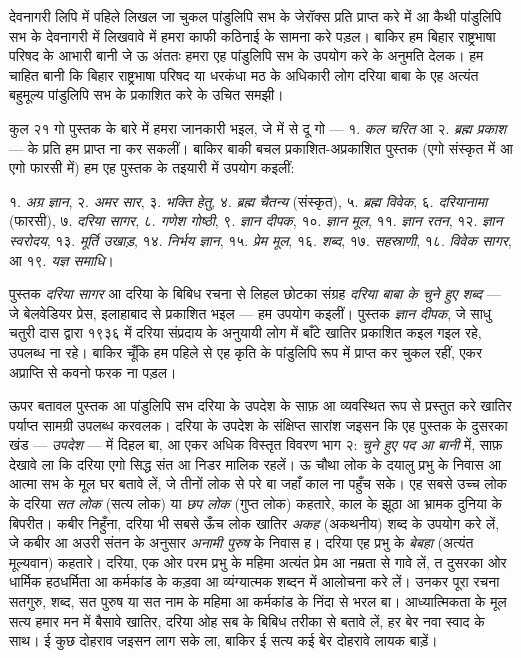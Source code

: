 देवनागरी लिपि में पहिले लिखल जा चुकल पांडुलिपि सभ के जेरॉक्स प्रति प्राप्त करे में आ कैथी पांडुलिपि सभ के देवनागरी में लिखवावे में हमरा काफी कठिनाई के सामना करे पड़ल। बाकिर हम बिहार राष्ट्रभाषा परिषद के आभारी बानी जे ऊ अंततः हमरा एह पांडुलिपि सभ के उपयोग करे के अनुमति देलक। हम चाहित बानी कि बिहार राष्ट्रभाषा परिषद या धरकंधा मठ के अधिकारी लोग दरिया बाबा के एह अत्यंत बहुमूल्य पांडुलिपि सभ के प्रकाशित करे के उचित समझी।

कुल २१ गो पुस्तक के बारे में हमरा जानकारी भइल, जे में से दू गो — १. \textit{कल चरित} आ २. \textit{ब्रह्म प्रकाश} — के प्रति हम प्राप्त ना कर सकलीं। बाकिर बाकी बचल प्रकाशित-अप्रकाशित पुस्तक (एगो संस्कृत में आ एगो फारसी में) हम एह पुस्तक के तइयारी में उपयोग कइलीं:

१. \textit{अग्र ज्ञान}, २. \textit{अमर सार}, ३. \textit{भक्ति हेतु}, ४. \textit{ब्रह्म चैतन्य} (संस्कृत), ५. \textit{ब्रह्म विवेक}, ६. \textit{दरियानामा} (फारसी), ७. \textit{दरिया सागर}, ८. \textit{गणेश गोष्ठी}, ९. \textit{ज्ञान दीपक}, १०. \textit{ज्ञान मूल}, ११. \textit{ज्ञान रतन}, १२. \textit{ज्ञान स्वरोदय}, १३. \textit{मूर्ति उखाड़}, १४. \textit{निर्भय ज्ञान}, १५. \textit{प्रेम मूल}, १६. \textit{शब्द}, १७. \textit{सहस्राणी}, १८. \textit{विवेक सागर}, आ १९. \textit{यज्ञ समाधि}।

पुस्तक \textit{दरिया सागर} आ दरिया के बिबिध रचना से लिहल छोटका संग्रह \textit{दरिया बाबा के चुने हुए शब्द} — जे बेलवेडियर प्रेस, इलाहाबाद से प्रकाशित भइल — हम उपयोग कइलीं। पुस्तक \textit{ज्ञान दीपक}, जे साधु चतुरी दास द्वारा १९३६ में दरिया संप्रदाय के अनुयायी लोग में बाँटे खातिर प्रकाशित कइल गइल रहे, उपलब्ध ना रहे। बाकिर चूँकि हम पहिले से एह कृति के पांडुलिपि रूप में प्राप्त कर चुकल रहीं, एकर अप्राप्ति से कवनो फरक ना पड़ल।

ऊपर बतावल पुस्तक आ पांडुलिपि सभ दरिया के उपदेश के साफ़ आ व्यवस्थित रूप से प्रस्तुत करे खातिर पर्याप्त सामग्री उपलब्ध करवलक। दरिया के उपदेश के संक्षिप्त सारांश जइसन कि एह पुस्तक के दुसरका खंड — \textit{उपदेश} — में दिहल बा, आ एकर अधिक विस्तृत विवरण भाग २: \textit{चुने हुए पद आ बानी} में, साफ़ देखावे ला कि दरिया एगो सिद्ध संत आ निडर मालिक रहलें। ऊ चौथा लोक के दयालु प्रभु के निवास आ आत्मा सभ के मूल घर बतावे लें, जे तीनों लोक से परे बा जहाँ काल ना पहुँच सके। एह सबसे उच्च लोक के दरिया \textit{सत लोक} (सत्य लोक) या \textit{छप लोक} (गुप्त लोक) कहतारे, काल के झूठा आ भ्रामक दुनिया के बिपरीत। कबीर निहुँना, दरिया भी सबसे ऊँच लोक खातिर \textit{अकह} (अकथनीय) शब्द के उपयोग करे लें, जे कबीर आ अउरी संतन के अनुसार \textit{अनामी पुरुष} के निवास ह। दरिया एह प्रभु के \textit{बेबहा} (अत्यंत मूल्यवान) कहतारे। दरिया, एक ओर परम प्रभु के महिमा अत्यंत प्रेम आ नम्रता से गावे लें, त दुसरका ओर धार्मिक हठधर्मिता आ कर्मकांड के कड़वा आ व्यंग्यात्मक शब्दन में आलोचना करे लें। उनकर पूरा रचना सतगुरु, शब्द, सत पुरुष या सत नाम के महिमा आ कर्मकांड के निंदा से भरल बा। आध्यात्मिकता के मूल सत्य हमार मन में बैसावे खातिर, दरिया ओह सब के बिबिध तरीका से बतावे लें, हर बेर नवा स्वाद के साथ। ई कुछ दोहराव जइसन लाग सके ला, बाकिर ई सत्य कई बेर दोहरावे लायक बाड़ें।

